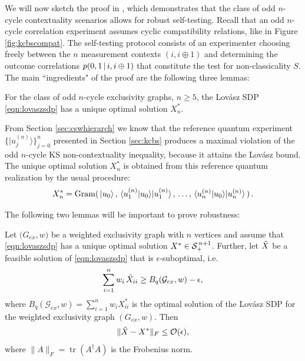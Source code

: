 We will now sketch the proof in \cite{Bharti2019}, which demonstrates that the class of odd $n$-cycle contextuality scenarios allows for robust self-testing. Recall that an odd $n$-cycle correlation experiment assumes cyclic compatibility relations, like in Figure \ref{fig:kcbscompat}. The self-testing protocol consists of an experimenter choosing freely between the $n$ measurement contexts $(i,i\oplus1)$ and determining the outcome correlations $p(0,1\thinspace\vert\thinspace i,i\oplus 1)$ that constitute the test for non-classicality $S$. The main ``ingredients" of the proof are the following three lemmas:

\begin{lemma}
\label{lem:kcbsunique}
For the class of odd $n$-cycle exclusivity graphs, $n\geq5$, the Lovász SDP \ref{eqn:lovaszsdp} has a unique optimal solution $X^*_n$.   
\end{lemma}

From Section \ref{sec:cswhierarch} we know that the reference quantum experiment $\{\vert u_j^{(n)} \rangle \}_{j=0}^{n}$ presented in Section \ref{sec:kcbs} produces a maximal violation of the odd $n$-cycle KS non-contextuality inequality, because it attains the Lovász bound. The unique optimal solution $X^*_n$ is obtained from this reference quantum realization by the usual procedure:
\begin{equation*}
    X^*_n=\operatorname{Gram}(\thinspace\vert u_0 \rangle\thinspace,\thinspace \langle u_1^{(n)} \vert u_0 \rangle \vert u_1^{(n)} \rangle\thinspace,\thinspace\dots,\thinspace \langle u_n^{(n)} \vert u_0 \rangle \vert u_n^{(n)} \rangle\thinspace)\thinspace.
\end{equation*}

The following two lemmas will be important to prove robustness:

\begin{lemma}
\label{lem:epssuboptgram}
Let $\mathcal({G}_{ex},w)$ be a weighted exclusivity graph with $n$ vertices and assume that \ref{eqn:lovaszsdp} has a unique optimal solution $X^*\in \mathcal{S}_+^{\thinspace n+1}$. Further, let $\Tilde{X}$ be a feasible solution of \ref{eqn:lovaszsdp} that is $\epsilon$-suboptimal, i.e.\
\begin{equation*}
    \sum_{i=1}^n w_i\thinspace\Tilde{X}_{ii} \geq B_{q}(\mathcal{G}_{ex},w)-\epsilon,
\end{equation*}
where $B_{q}(\mathcal{G}_{ex},w)=\sum_{i=1}^n w_i X_{ii}^*$ is the optimal solution of the Lovász SDP for the weighted exclusivity graph $({G}_{ex},w)$.
Then
\begin{equation*}
\|\Tilde{X}-X^*\|_F \leq \mathcal{O}(\epsilon),
\end{equation*}
where $\|A\|_F=\operatorname{tr}(A^{\dag}A)$ is the Frobenius norm.
\end{lemma}

